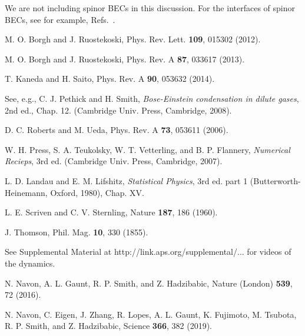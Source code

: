 \documentclass[pra,aps,superscriptaddress,twocolumn,color]{revtex4-1}
\begin{document}
\begin{thebibliography}{99}
We are not including spinor BECs in this discussion.
For the interfaces of spinor BECs, see for example, Refs.~\cite{Borgh,
  Borgh2, Kaneda}.

M. O. Borgh and J. Ruostekoski,
Phys. Rev. Lett. \textbf{109}, 015302 (2012).

M. O. Borgh and J. Ruostekoski,
Phys. Rev. A \textbf{87}, 033617 (2013).

T. Kaneda and H. Saito,
Phys. Rev. A \textbf{90}, 053632 (2014).

See, e.g., C. J. Pethick and H. Smith, {\it Bose-Einstein condensation in
dilute gases}, 2nd ed., Chap. 12. (Cambridge Univ. Press, Cambridge, 2008).

D. C. Roberts and M. Ueda,
Phys. Rev. A \textbf{73}, 053611 (2006).

W. H. Press, S. A. Teukolsky, W. T. Vetterling, and B. P. Flannery,
{\it Numerical Recieps}, 3rd ed. (Cambridge Univ. Press, Cambridge, 2007).  

L. D. Landau and E. M. Lifshitz,
{\it Statistical Physics}, 3rd ed. part 1 (Butterworth-Heinemann, Oxford,
1980), Chap. XV.

L. E. Scriven and C. V. Sternling,
Nature \textbf{187}, 186 (1960).

J. Thomson,
Phil. Mag. \textbf{10}, 330 (1855).

See Supplemental Material at http://link.aps.org/supplemental/... for videos
of the dynamics.

N. Navon, A. L. Gaunt, R. P. Smith, and Z. Hadzibabic,
Nature (London) \textbf{539}, 72 (2016).

N. Navon, C. Eigen, J. Zhang, R. Lopes, A. L. Gaunt, K. Fujimoto,
M. Tsubota, R. P. Smith, and Z. Hadzibabic,
Science \textbf{366}, 382 (2019).

\end{thebibliography}
\end{document}
